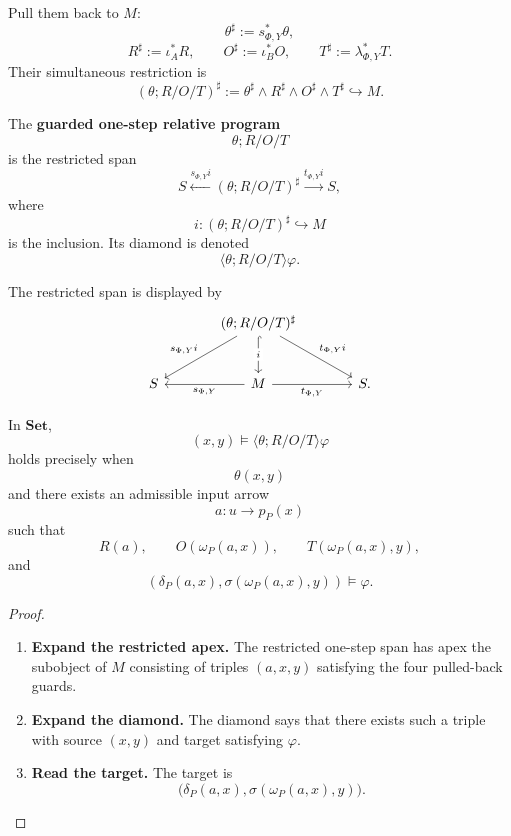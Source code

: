 Pull them back to \(M\):
\[
\theta^\sharp:=s_{\Phi,Y}^\ast\theta,
\]
\[
R^\sharp:=\iota_A^\ast R,
\qquad
O^\sharp:=\iota_B^\ast O,
\qquad
T^\sharp:=\lambda_{\Phi,Y}^\ast T.
\]
Their simultaneous restriction is
\[
(\theta;R/O/T)^\sharp
:=
\theta^\sharp\wedge R^\sharp\wedge O^\sharp\wedge T^\sharp
\hookrightarrow M.
\]

\begin{definition}
\label{def:poly-relative-guarded-primitive}
The \textbf{guarded one-step relative program}
\[
\theta;R/O/T
\]
is the restricted span
\[
S
\xleftarrow{s_{\Phi,Y}i}
(\theta;R/O/T)^\sharp
\xrightarrow{t_{\Phi,Y}i}
S,
\]
where
\[
i:(\theta;R/O/T)^\sharp\hookrightarrow M
\]
is the inclusion.  Its diamond is denoted
\[
\langle\theta;R/O/T\rangle\varphi.
\]
\end{definition}

The restricted span is displayed by
\[
\begin{tikzcd}[column sep=large,row sep=large]
&
(\theta;R/O/T)^\sharp
  \arrow[dl,"s_{\Phi,Y}i"']
  \arrow[dr,"t_{\Phi,Y}i"]
  \arrow[d,hook,"i" description]
&
\\
S
&
M
  \arrow[l,"s_{\Phi,Y}"]
  \arrow[r,"t_{\Phi,Y}"']
&
S .
\end{tikzcd}
\]

\begin{proposition}
\label{prop:poly-relative-guarded-primitive-external}
In \(\mathbf{Set}\),
\[
(x,y)\models\langle\theta;R/O/T\rangle\varphi
\]
holds precisely when
\[
\theta(x,y)
\]
and there exists an admissible input arrow
\[
a:u\to p_P(x)
\]
such that
\[
R(a),
\qquad
O(\omega_P(a,x)),
\qquad
T(\omega_P(a,x),y),
\]
and
\[
\left(
\delta_P(a,x),
\sigma(\omega_P(a,x),y)
\right)
\models\varphi.
\]
\end{proposition}

\begin{proof}
\leavevmode
\begin{enumerate}
\item \textbf{Expand the restricted apex.}
The restricted one-step span has apex the subobject of \(M\) consisting of
triples \((a,x,y)\) satisfying the four pulled-back guards.

\item \textbf{Expand the diamond.}
The diamond says that there exists such a triple with source \((x,y)\) and
target satisfying \(\varphi\).

\item \textbf{Read the target.}
The target is
\[
\bigl(
\delta_P(a,x),
\sigma(\omega_P(a,x),y)
\bigr).
\]
\end{enumerate}
\end{proof}


